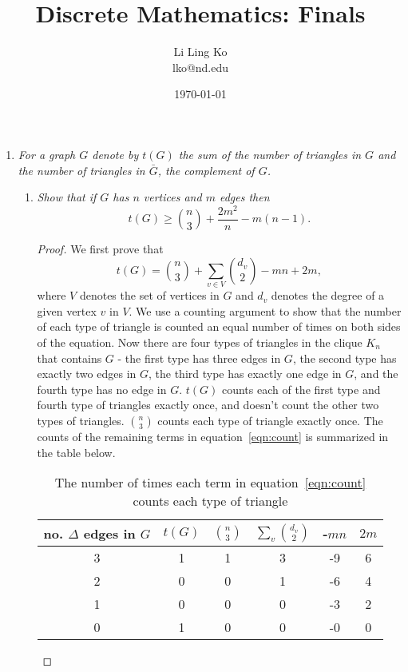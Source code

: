 \documentclass{article}
\begin{document}
\title{Discrete Mathematics: Finals}
\author{Li Ling Ko\\ lko@nd.edu}
\date{\today}
\maketitle

\begin{enumerate}
  \item \it For a graph $G$ denote by $t(G)$ the sum of the number of
    triangles in $G$ and the number of triangles in $\bar{G}$, the
    complement of $G$. 

    \begin{enumerate}
      \item \it Show that if $G$ has $n$ vertices and $m$ edges then
        \[t(G) \geq \binom{n}{3} +\frac{2m^2}{n} -m(n-1).\]

        \begin{proof}
          We first prove that
          \begin{equation}
            t(G) =\binom{n}{3} +\sum_{v\in V}\binom{d_v}{2} -mn +2m,
            \label{eqn:count}
          \end{equation}
          where $V$ denotes the set of vertices in $G$ and $d_v$ denotes
          the degree of a given vertex $v$ in $V$. We use a counting
          argument to show that the number of each type of triangle is
          counted an equal number of times on both sides of the equation.
          Now there are four types of triangles in the clique $K_n$ that
          contains $G$ - the first type has three edges in $G$, the second
          type has exactly two edges in $G$, the third type has exactly one
          edge in $G$, and the fourth type has no edge in $G$. $t(G)$
          counts each of the first type and fourth type of triangles
          exactly once, and doesn't count the other two types of triangles.
          $\binom{n}{3}$ counts each type of triangle exactly once. The
          counts of the remaining terms in equation~\eqref{eqn:count} is
          summarized in the table below.

          \begin{table}[ht]
            \begin{center}
              \begin{tabular}{c|ccccc}
                no. $\Delta$ edges in $G$ &$t(G)$ &$\binom{n}{3}$
                  &$\sum_v\binom{d_v}{2}$ &-$mn$ &$2m$ \\
                \hline
                3 &1 &1 &3 &-9 &6 \\
                2 &0 &0 &1 &-6 &4 \\
                1 &0 &0 &0 &-3 &2 \\
                0 &1 &0 &0 &-0 &0 \\
              \end{tabular}
              \caption{The number of times each term in
              equation~\eqref{eqn:count} counts each type of triangle}
            \end{center}
          \end{table}


\end{proof}
\end{enumerate}
\end{enumerate}
\end{document}
